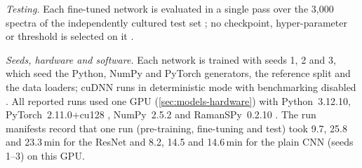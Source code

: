 \documentclass[journal,onecolumn]{IEEEtran}
\begin{document}
\emph{Testing.} Each fine-tuned network is evaluated in a single pass over
the 3{,}000 spectra of the independently cultured test set
\cite{ho2019rapid}; no checkpoint, hyper-parameter or threshold is
selected on it \cite{dietterich1998approximate}.

\emph{Seeds, hardware and software.} Each network is trained with seeds 1,
2 and 3, which seed the Python, NumPy \cite{harris2020array} and PyTorch
\cite{paszke2019pytorch} generators, the reference split and the data
loaders; cuDNN runs in deterministic mode with benchmarking disabled
\cite{paszke2019pytorch}. All reported runs used one GPU
(\cref{sec:models-hardware}) with Python~3.12.10,
PyTorch~2.11.0+cu128 \cite{paszke2019pytorch},
NumPy~2.5.2 \cite{harris2020array} and RamanSPy~0.2.10
\cite{georgiev2024ramanspy}. The run manifests record that one run
(pre-training, fine-tuning and test) took 9.7, 25.8 and 23.3\,min for the
ResNet and 8.2, 14.5 and 14.6\,min for the plain CNN (seeds 1--3) on this
GPU.
\end{document}
